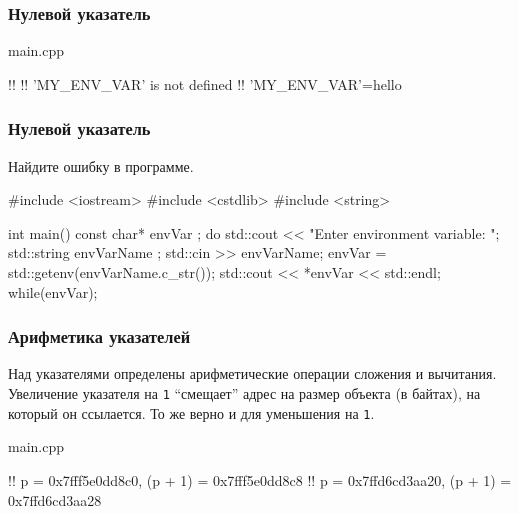 \documentclass[compress, 8pt]{beamer}
\begin{document}
\begin{frame}[fragile]

    \frametitle{Нулевой указатель}

    \hfill \break

        {main.cpp}

    \begin{terminalwindow}
!!
!!
'MY_ENV_VAR' is not defined
!!
'MY_ENV_VAR'=hello
    \end{terminalwindow}

\end{frame}

\begin{frame}[fragile]

    \frametitle{Нулевой указатель}

    \begin{task}
        Найдите ошибку в программе.
    \end{task}

    \begin{myinplacelisting}[minted language=cpp]
#include <iostream>
#include <cstdlib>
#include <string>

int main() {
    const char* envVar {};
    do {
        std::cout << "Enter environment variable: ";
        std::string envVarName {};
        std::cin >> envVarName;
        envVar = std::getenv(envVarName.c_str());
        std::cout << *envVar << std::endl;
    }
    while(envVar);
}
    \end{myinplacelisting}

\end{frame}

\begin{frame}[fragile]

    \frametitle{Арифметика указателей}

    \hfill \break

    Над указателями определены арифметические операции сложения и вычитания.
    Увеличение указателя на \verb|1| \enquote{смещает} адрес на размер объекта
    (в байтах), на который он ссылается.
    То же верно и для уменьшения на \verb|1|.

        {main.cpp}

    \begin{terminalwindow}
!!
p = 0x7fff5e0dd8c0, (p + 1) = 0x7fff5e0dd8c8
!!
p = 0x7ffd6cd3aa20, (p + 1) = 0x7ffd6cd3aa28
    \end{terminalwindow}

\end{frame}
\end{document}
